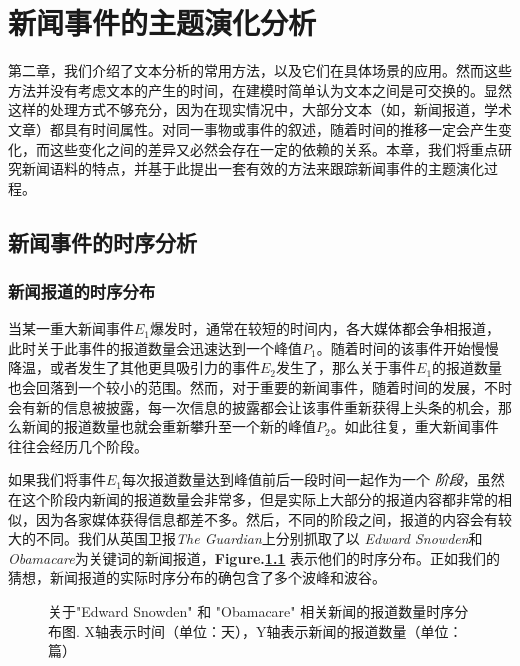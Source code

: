 \chapter{新闻事件的主题演化分析}
第二章，我们介绍了文本分析的常用方法，以及它们在具体场景的应用。然而这些方法并没有考虑文本的产生的时间，在建模时简单认为文本之间是可交换的。显然这样的处理方式不够充分，因为在现实情况中，大部分文本（如，新闻报道，学术文章）都具有时间属性。对同一事物或事件的叙述，随着时间的推移一定会产生变化，而这些变化之间的差异又必然会存在一定的依赖的关系。本章，我们将重点研究新闻语料的特点，并基于此提出一套有效的方法来跟踪新闻事件的主题演化过程。

\section{新闻事件的时序分析}
\subsection{新闻报道的时序分布}
当某一重大新闻事件$E_1$爆发时，通常在较短的时间内，各大媒体都会争相报道，此时关于此事件的报道数量会迅速达到一个峰值$P_1$。随着时间的该事件开始慢慢降温，或者发生了其他更具吸引力的事件$E_2$发生了，那么关于事件$E_1$的报道数量也会回落到一个较小的范围。然而，对于重要的新闻事件，随着时间的发展，不时会有新的信息被披露，每一次信息的披露都会让该事件重新获得上头条的机会，那么新闻的报道数量也就会重新攀升至一个新的峰值$P_2$。如此往复，重大新闻事件往往会经历几个阶段。

如果我们将事件$E_1$每次报道数量达到峰值前后一段时间一起作为一个 \emph{阶段}，虽然在这个阶段内新闻的报道数量会非常多，但是实际上大部分的报道内容都非常的相似，因为各家媒体获得信息都差不多。然后，不同的阶段之间，报道的内容会有较大的不同。我们从英国卫报\emph{The Guardian}上分别抓取了以 \emph{Edward Snowden}和\emph{Obamacare}为关键词的新闻报道，\textbf{Figure.\ref{temporal distribution}} 表示他们的时序分布。正如我们的猜想，新闻报道的实际时序分布的确包含了多个波峰和波谷。

\begin{figure}[htb]
	\caption{关于"Edward Snowden" 和 "Obamacare" 相关新闻的报道数量时序分布图. X轴表示时间（单位：天），Y轴表示新闻的报道数量（单位：篇）}
	\label{temporal distribution}
\end{figure}

